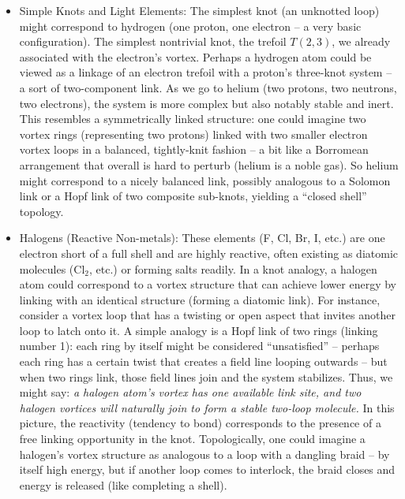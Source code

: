 \begin{itemize}

\item 
Simple Knots and Light Elements: The simplest knot (an unknotted loop) might correspond to hydrogen (one proton, one electron – a very basic configuration). The simplest nontrivial knot, the trefoil $T(2,3)$, we already associated with the electron’s vortex. Perhaps a hydrogen atom could be viewed as a linkage of an electron trefoil with a proton’s three-knot system – a sort of two-component link. As we go to helium (two protons, two neutrons, two electrons), the system is more complex but also notably stable and inert. This resembles a symmetrically linked structure: one could imagine two vortex rings (representing two protons) linked with two smaller electron vortex loops in a balanced, tightly-knit fashion – a bit like a Borromean arrangement that overall is hard to perturb (helium is a noble gas). So helium might correspond to a nicely balanced link, possibly analogous to a Solomon link or a Hopf link of two composite sub-knots, yielding a “closed shell” topology.




\item 
Halogens (Reactive Non-metals): These elements (F, Cl, Br, I, etc.) are one electron short of a full shell and are highly reactive, often existing as diatomic molecules (Cl$_2$, etc.) or forming salts readily. In a knot analogy, a halogen atom could correspond to a vortex structure that can achieve lower energy by linking with an identical structure (forming a diatomic link). For instance, consider a vortex loop that has a twisting or open aspect that invites another loop to latch onto it. A simple analogy is a Hopf link of two rings (linking number 1): each ring by itself might be considered “unsatisfied” – perhaps each ring has a certain twist that creates a field line looping outwards – but when two rings link, those field lines join and the system stabilizes. Thus, we might say: \textit{a halogen atom’s vortex has one available link site, and two halogen vortices will naturally join to form a stable two-loop molecule.} In this picture, the reactivity (tendency to bond) corresponds to the presence of a free linking opportunity in the knot. Topologically, one could imagine a halogen’s vortex structure as analogous to a loop with a dangling braid – by itself high energy, but if another loop comes to interlock, the braid closes and energy is released (like completing a shell).





\end{itemize}
